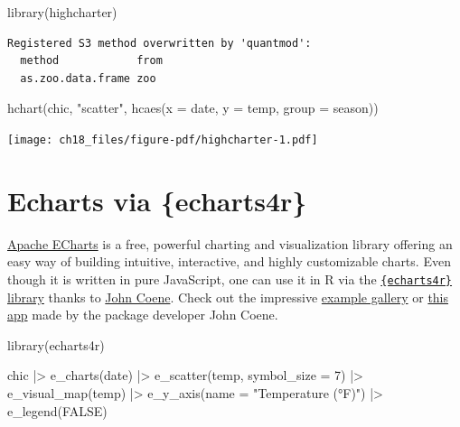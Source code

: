 \documentclass[
  letterpaper,
]{scrbook}
\newenvironment{Shaded}{\begin{snugshade}}{\end{snugshade}}
\newcommand{\AttributeTok}[1]{\textcolor[rgb]{0.40,0.45,0.13}{#1}}
\newcommand{\ConstantTok}[1]{\textcolor[rgb]{0.56,0.35,0.01}{#1}}
\newcommand{\DecValTok}[1]{\textcolor[rgb]{0.68,0.00,0.00}{#1}}
\newcommand{\FunctionTok}[1]{\textcolor[rgb]{0.28,0.35,0.67}{#1}}
\newcommand{\NormalTok}[1]{\textcolor[rgb]{0.00,0.23,0.31}{#1}}
\newcommand{\SpecialCharTok}[1]{\textcolor[rgb]{0.37,0.37,0.37}{#1}}
\newcommand{\StringTok}[1]{\textcolor[rgb]{0.13,0.47,0.30}{#1}}
\begin{document}
\begin{Shaded}
\begin{Highlighting}[]
\FunctionTok{library}\NormalTok{(highcharter)}
\end{Highlighting}
\end{Shaded}

\begin{verbatim}
Registered S3 method overwritten by 'quantmod':
  method            from
  as.zoo.data.frame zoo 
\end{verbatim}

\begin{Shaded}
\begin{Highlighting}[]
\FunctionTok{hchart}\NormalTok{(chic, }\StringTok{"scatter"}\NormalTok{, }\FunctionTok{hcaes}\NormalTok{(}\AttributeTok{x =}\NormalTok{ date, }\AttributeTok{y =}\NormalTok{ temp, }\AttributeTok{group =}\NormalTok{ season))}
\end{Highlighting}
\end{Shaded}

\texttt{[image: ch18\_files/figure-pdf/highcharter-1.pdf]}

\section{Echarts via \{echarts4r\}}\label{echarts-via-echarts4r}

\href{https://echarts.apache.org/en/index.html}{Apache ECharts} is a
free, powerful charting and visualization library offering an easy way
of building intuitive, interactive, and highly customizable charts. Even
though it is written in pure JavaScript, one can use it in R via the
\href{https://echarts4r.john-coene.com/}{\texttt{\{echarts4r\}} library}
thanks to \href{https://john-coene.com/}{John Coene}. Check out the
impressive
\href{https://echarts4r.john-coene.com/articles/chart_types.html}{example
gallery} or \href{https://johncoene.shinyapps.io/fopi-contest/}{this
app} made by the package developer John Coene.

\begin{Shaded}
\begin{Highlighting}[]
\FunctionTok{library}\NormalTok{(echarts4r)}

\NormalTok{chic }\SpecialCharTok{|\textgreater{}}
  \FunctionTok{e\_charts}\NormalTok{(date) }\SpecialCharTok{|\textgreater{}}
  \FunctionTok{e\_scatter}\NormalTok{(temp, }\AttributeTok{symbol\_size =} \DecValTok{7}\NormalTok{) }\SpecialCharTok{|\textgreater{}}
  \FunctionTok{e\_visual\_map}\NormalTok{(temp) }\SpecialCharTok{|\textgreater{}}
  \FunctionTok{e\_y\_axis}\NormalTok{(}\AttributeTok{name =} \StringTok{"Temperature (°F)"}\NormalTok{) }\SpecialCharTok{|\textgreater{}}
  \FunctionTok{e\_legend}\NormalTok{(}\ConstantTok{FALSE}\NormalTok{)}
\end{Highlighting}
\end{Shaded}
\end{document}
